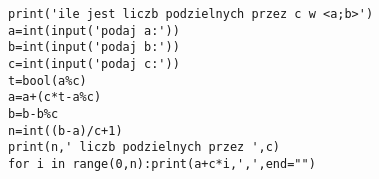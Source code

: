 \begin{verbatim}
print('ile jest liczb podzielnych przez c w <a;b>')
a=int(input('podaj a:'))
b=int(input('podaj b:'))
c=int(input('podaj c:'))
t=bool(a%c)
a=a+(c*t-a%c)
b=b-b%c
n=int((b-a)/c+1)
print(n,' liczb podzielnych przez ',c)
for i in range(0,n):print(a+c*i,',',end="")
\end{verbatim}